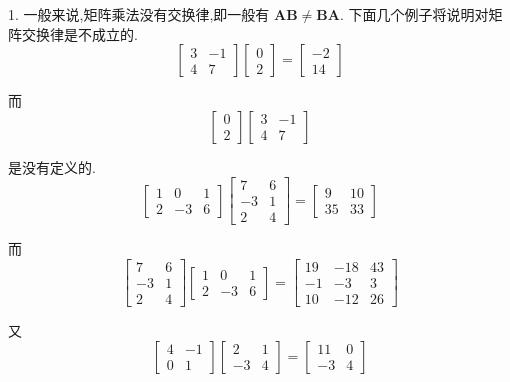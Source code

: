 
1. 一般来说,矩阵乘法没有交换律,即一般有 $\bm{A}\bm{B} \neq \bm{B}\bm{A}$. 下面几个例子将说明对矩阵交换律是不成立的.
\[
\begin{bmatrix} 3 & -1 \\ 4 & 7 \end{bmatrix}\begin{bmatrix} 0 \\ 2 \end{bmatrix} = \begin{bmatrix} -2 \\ 14 \end{bmatrix}
\]

而
\[
\begin{bmatrix} 0 \\ 2 \end{bmatrix}\begin{bmatrix} 3 & -1 \\ 4 & 7 \end{bmatrix}
\]

是没有定义的.
\[
\begin{bmatrix} 1 & 0 & 1 \\ 2 & -3 & 6 \end{bmatrix}\begin{bmatrix} 7 & 6 \\ -3 & 1 \\ 2 & 4 \end{bmatrix} = \begin{bmatrix} 9 & 10 \\ 35 & 33 \end{bmatrix}
\]

而
\[
\begin{bmatrix} 7 & 6 \\ -3 & 1 \\ 2 & 4 \end{bmatrix}\begin{bmatrix} 1 & 0 & 1 \\ 2 & -3 & 6 \end{bmatrix} = \begin{bmatrix} 19 & -18 & 43 \\ -1 & -3 & 3 \\ 10 & -12 & 26 \end{bmatrix}
\]

又
\[
\begin{bmatrix} 4 & -1 \\ 0 & 1 \end{bmatrix}\begin{bmatrix} 2 & 1 \\ -3 & 4 \end{bmatrix} = \begin{bmatrix} 11 & 0 \\ -3 & 4 \end{bmatrix}
\]

